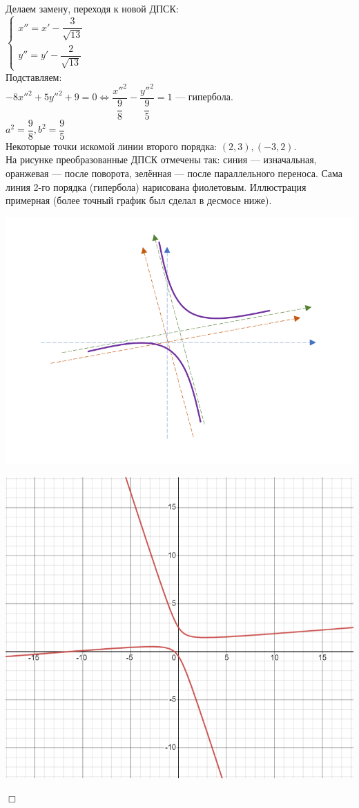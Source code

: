 \documentclass[a4paper, 12pt]{report}
\newenvironment{examp} %
{\par\noindent{\textbf{\textsc{Пример:}}}} %
{\hfill$\scriptstyle\Box$}
\begin{document}
\begin{examp}
	\\
	Делаем замену, переходя к новой ДПСК:
	\\
	$\begin{cases}
		x'' = x' - \dfrac{3}{\sqrt{13}} \\
		y'' = y' - \dfrac{2}{\sqrt{13}}
	\end{cases}$
	\\
	Подставляем:
	\\
	$-8x''^2 + 5y''^2 + 9 = 0 \Leftrightarrow \dfrac{x''^2}{\dfrac{9}{8}} - \dfrac{y''^2}{\dfrac{9}{5}} = 1$ --- гипербола.
	\\
	$a^2 = \dfrac{9}{8}, b^2 = \dfrac{9}{5}$
	\\
	Некоторые точки искомой линии второго порядка: $(2, 3), (-3, 2)$.
	\\
	На рисунке преобразованные ДПСК отмечены так: синия --- изначальная, оранжевая --- после поворота, зелённая --- после параллельного переноса. Сама линия 2-го порядка (гипербола) нарисована фиолетовым. Иллюстрация примерная (более точный график был сделал в десмосе ниже).
	\begin{center}
		\includegraphics[scale=0.8]{Л2П_2.PNG}
	\end{center}
	\begin{center}
		\includegraphics[scale=0.8]{Л2П_3.PNG}

\end{center}
\end{examp}
\end{document}
